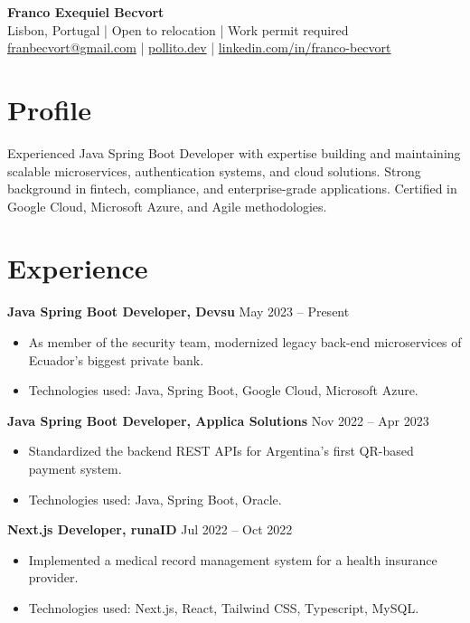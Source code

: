 \documentclass[10pt, letterpaper]{article}
\begin{document}
\begin{center}
    {\LARGE\bfseries Franco Exequiel Becvort} \\
    Lisbon, Portugal | Open to relocation | Work permit required \\
    \href{mailto:franbecvort@gmail.com}{franbecvort@gmail.com} | 
    \href{https://pollito.dev/}{pollito.dev} | 
    \href{https://linkedin.com/in/franco-becvort}{linkedin.com/in/franco-becvort} \\
\end{center}

\vspace{5pt}

\section{Profile}
Experienced Java Spring Boot Developer with expertise building and maintaining scalable microservices, authentication systems, and cloud solutions. Strong background in fintech, compliance, and enterprise-grade applications. Certified in Google Cloud, Microsoft Azure, and Agile methodologies.

\section{Experience}
\textbf{Java Spring Boot Developer, Devsu} \hfill May 2023 – Present \
\begin{itemize}[leftmargin=10pt, noitemsep]
    \item As member of the security team, modernized legacy back-end microservices of Ecuador's biggest private bank.
    \item Technologies used: Java, Spring Boot, Google Cloud, Microsoft Azure.
\end{itemize}

\textbf{Java Spring Boot Developer, Applica Solutions} \hfill Nov 2022 – Apr 2023 \
\begin{itemize}[leftmargin=10pt, noitemsep]
    \item Standardized the backend REST APIs for Argentina’s first QR-based payment system.
    \item Technologies used: Java, Spring Boot, Oracle.
\end{itemize}

\textbf{Next.js Developer, runaID} \hfill Jul 2022 – Oct 2022 \
\begin{itemize}[leftmargin=10pt, noitemsep]
    \item Implemented a medical record management system for a health insurance provider.
    \item Technologies used: Next.js, React, Tailwind CSS, Typescript, MySQL.
\end{itemize}
\end{document}
